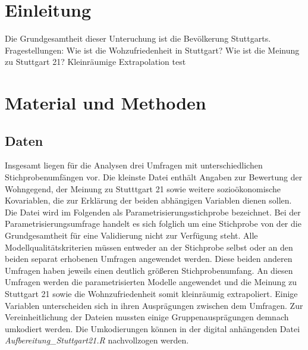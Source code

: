 \documentclass{Vorlage}
\begin{document}
\restoregeometry


\pagestyle{plain}

\tableofcontents %

\newpage %

\listoffigures %

\listoftables %

\newpage



\pagestyle{fancy}

\section{Einleitung}
Die Grundgesamtheit dieser Unteruchung ist die Bevölkerung Stuttgarts.
Fragestellungen: Wie ist die Wohzufriedenheit in Stuttgart? Wie ist die Meinung zu Stuttgart 21? Kleinräumige Extrapolation
test

\newpage

\section{Material und Methoden}
\subsection{Daten}
Insgesamt liegen für die Analysen drei Umfragen mit unterschiedlichen Stichprobenumfängen vor. Die kleinste Datei enthält Angaben zur Bewertung der Wohngegend, der Meinung zu Stutttgart 21 sowie weitere sozioökonomische Kovariablen, die zur Erklärung der beiden abhängigen Variablen dienen sollen. Die Datei wird im Folgenden als Parametrisierungsstichprobe bezeichnet. Bei der Parametrisierungsumfrage handelt es sich folglich um eine Stichprobe von der die Grundgesamtheit für eine Validierung nicht zur Verfügung steht. Alle Modellqualitätskriterien müssen entweder an der Stichprobe selbst oder an den beiden separat erhobenen Umfragen angewendet werden. Diese beiden anderen Umfragen haben jeweils einen deutlich größeren Stichprobenumfang. An diesen Umfragen werden die parametrisierten Modelle angewendet und die Meinung zu Stuttgart 21 sowie die Wohnzufriedenheit somit kleinräumig extrapoliert. Einige Variablen unterscheiden sich in ihren Ausprägungen zwischen dem Umfragen. Zur Vereinheitlichung der Dateien mussten einige Gruppenausprägungen demnach umkodiert werden. Die Umkodierungen können in der digital anhängenden Datei \textit{Aufbereitung\_Stuttgart21.R} nachvollzogen werden.
\end{document}
